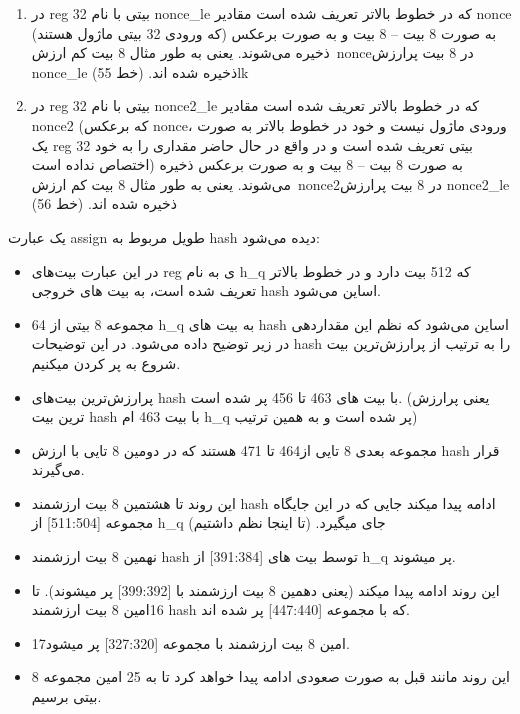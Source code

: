 \begin{enumerate}
	\item در reg 32 بیتی با نام nonce\_le که در خطوط بالاتر تعریف شده است مقادیر nonce (که ورودی 32 بیتی ماژول هستند) به صورت 8 بیت – 8 بیت و به صورت برعکس ذخیره می‌شوند. یعنی به طور مثال 8 بیت کم ارزش\  nonceدر 8 بیت پرارزش nonce\_le ذخیره شده اند. (خط 55)lk\par
	      
	\item در reg 32 بیتی با نام nonce2\_le که در خطوط بالاتر تعریف شده است مقادیر nonce2 (که برعکس nonce، ورودی ماژول نیست و خود در خطوط بالاتر به صورت یک reg 32 بیتی تعریف شده است و در واقع در حال حاضر مقداری را به خود اختصاص نداده است) به صورت 8 بیت – 8 بیت و به صورت برعکس ذخیره می‌شوند. یعنی به طور مثال 8 بیت کم ارزش\  nonce2در 8 بیت پرارزش nonce2\_le ذخیره شده اند. (خط 56)
\end{enumerate}

یک عبارت assign طویل مربوط به hash دیده می‌شود:

\begin{itemize}
	\item
	      در این عبارت بیت‌های reg ی به نام
	      h\_q 
	      که 512 بیت دارد و در خطوط بالاتر تعریف شده است، به بیت های خروجی hash اساین می‌شود.
	\item
	      64 مجموعه 8 بیتی از h\_q به بیت های hash اساین می‌شود که نظم این مقداردهی در زیر توضیح داده می‌شود. در این توضیحات hash را به ترتیب از پرارزش‌ترین بیت شروع به پر کردن میکنیم.
	\item
	      پرارزش‌ترین بیت‌های hash با بیت های 463 تا 456 پر شده است. (یعنی پرارزش ترین بیت hash با بیت 463 ام h\_q پر شده است و به همین ترتیب)
	\item
	      مجموعه بعدی 8 تایی از464 تا 471 هستند که در دومین 8 تایی با ارزش hash قرار می‌گیرند.
	\item
	      این روند تا هشتمین 8 بیت ارزشمند hash ادامه پیدا میکند جایی که در این جایگاه مجموعه [511:504] از h\_q جای میگیرد. (تا اینجا نظم داشتیم)
	\item
	      نهمین 8 بیت ارزشمند hash توسط بیت های [391:384] از h\_q پر میشوند.
	\item
	      این روند ادامه پیدا میکند (یعنی دهمین 8 بیت ارزشمند با [399:392] پر میشوند).
	      تا 16امین 8 بیت ارزشمند hash که با مجموعه [447:440] پر شده اند.
	\item
	      17امین 8 بیت ارزشمند با مجموعه [327:320] پر میشود.
	\item
	      این روند مانند قبل به صورت صعودی ادامه پیدا خواهد کرد تا به 25 امین مجموعه 8 بیتی برسیم.
	      
\end{itemize}

